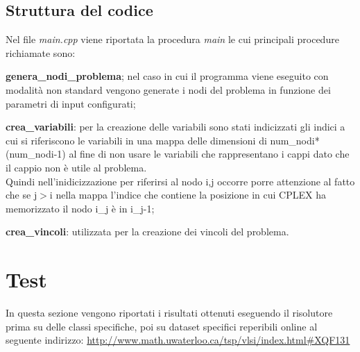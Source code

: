 \documentclass{article}
\begin{document}
\subsection{Struttura del codice}
Nel file \textit{main.cpp} viene riportata la procedura \textit{main} le cui principali procedure richiamate sono:
\begin{description}
\item \textbf{genera\_nodi\_problema}; nel caso in cui il programma viene eseguito con modalità non standard vengono generate i nodi del problema in funzione dei parametri di input configurati;
\item \textbf{crea\_variabili}: per la creazione delle variabili sono stati indicizzati gli indici a cui si riferiscono le variabili in una mappa delle dimensioni di num\_nodi*(num\_nodi-1) al fine di non usare le variabili che rappresentano i cappi dato che il cappio non è utile al problema.\\
Quindi nell'inidicizzazione per riferirsi al nodo i,j occorre porre attenzione al fatto che se j$>$i nella mappa l'indice che contiene la posizione in cui CPLEX ha memorizzato il nodo i\_j è in i\_j-1;    
\item \textbf{crea\_vincoli}: utilizzata per la creazione dei vincoli del problema.
\end{description}  

\section{Test}
In questa sezione vengono riportati i risultati ottenuti eseguendo il risolutore prima su delle classi specifiche, poi su dataset specifici reperibili online al seguente indirizzo: \url{http://www.math.uwaterloo.ca/tsp/vlsi/index.html#XQF131}
\end{document}
